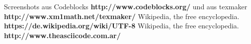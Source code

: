  Screenshots aus Codeblocks \textbf{http://www.codeblocks.org/} und aus texmaker \textbf{http://www.xm1math.net/texmaker/}
 Wikipedia, the free encyclopedia. \textbf{https://de.wikipedia.org/wiki/UTF-8}
 Wikipedia, the free encyclopedia. \textbf{http://www.theasciicode.com.ar/}